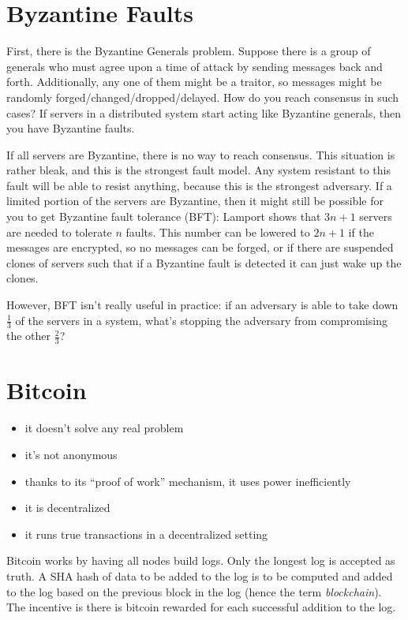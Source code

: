 \documentclass[twoside]{article}
\begin{document}
\section{Byzantine Faults}

First, there is the Byzantine Generals problem. Suppose there is a group of generals who must agree upon a time of attack by sending messages back and forth. Additionally, any one of them might be a traitor, so messages might be randomly forged/changed/dropped/delayed. How do you reach consensus in such cases? If servers in a distributed system start acting like Byzantine generals, then you have Byzantine faults.

If all servers are Byzantine, there is no way to reach consensus. This situation is rather bleak, and this is the strongest fault model. Any system resistant to this fault will be able to resist anything, because this is the strongest adversary. If a limited portion of the servers are Byzantine, then it might still be possible for you to get Byzantine fault tolerance (BFT): Lamport shows that $3n + 1$ servers are needed to tolerate $n$ faults. This number can be lowered to $2n + 1$ if the messages are encrypted, so no messages can be forged, or if there are suspended clones of servers such that if a Byzantine fault is detected it can just wake up the clones.

However, BFT isn't really useful in practice: if an adversary is able to take down $\frac{1}{3}$ of the servers in a system, what's stopping the adversary from compromising the other $\frac{2}{3}$?

\section{Bitcoin}

\begin{itemize}
    \item it doesn't solve any real problem
    \item it's not anonymous
    \item thanks to its ``proof of work'' mechanism, it uses power inefficiently
    \item it is decentralized
    \item it runs true transactions in a decentralized setting
\end{itemize}

Bitcoin works by having all nodes build logs. Only the longest log is accepted as truth. A SHA hash of data to be added to the log is to be computed and added to the log based on the previous block in the log (hence the term \textit{blockchain}). The incentive is there is bitcoin rewarded for each successful addition to the log.
\end{document}
